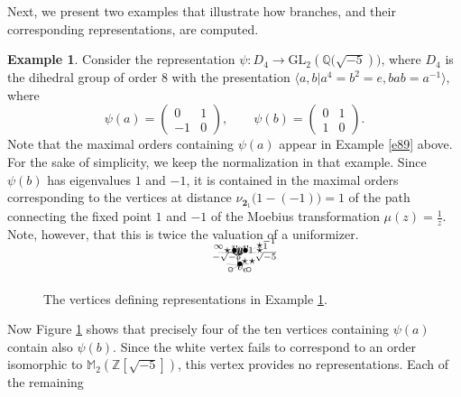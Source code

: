 \documentclass{article}
\theoremstyle{definition}
\newtheorem{ex}[Prop]{Example}
\theoremstyle{remark}
\newcommand\bmattrix[4]{\left(\begin{array}{cc}#1&#2\\#3&#4\end{array}\right)}
\begin{document}
Next, we present two examples that illustrate how branches,
and their corresponding representations, are computed.

\begin{ex}\label{e92}
Consider the representation 
$\psi:D_4\rightarrow\mathrm{GL}_2(\mathbb{Q}
\big(\sqrt{-5})\big)$, where
$D_4$ is the dihedral group of order $8$ with the presentation
$\langle a,b| a^4=b^2=e, bab=a^{-1}\rangle$, where
$$\psi(a)=\bmattrix 01{-1}0,\qquad\psi(b)=\bmattrix 0110.$$
Note that the maximal orders containing $\psi(a)$ appear 
in Example \ref{e89} above. 
For the sake of simplicity, we keep the
normalization in that example.
Since $\psi(b)$ has eigenvalues $1$ and $-1$, it is
contained in the maximal orders corresponding 
to the vertices at distance
$\nu_{\mathbf{2}_1}\big(1-(-1)\big)=1$ 
of the path connecting the
fixed point $1$ and $-1$ of the Moebius 
transformation $\mu(z)=\frac1z$.
Note, however, that this is twice
the valuation of a uniformizer.
\begin{figure}
\unitlength 1mm %
\linethickness{0.4pt}
\ifx\plotpoint\undefined\newsavebox{\plotpoint}\fi %
\[
\begin{picture}(38,12)(-6,40)
\put(15.2,43.2){$\bullet$}\put(15.2,51.8){$\circ$}
\put(16,44){\line(0,1){8}}
\multiput(16,44)(0.688,-.4){10}{\line(1,0){.3}}
\multiput(16,44)(-0.688,-.4){10}{\line(-1,0){.3}}
\put(7.7,38.7){$\circ$}\put(22.3,38.7){$\circ$}
\multiput(15.4,52.6)(-0.086,.05){40}{\line(-1,0){.3}}
\multiput(16.6,52.6)(0.086,.05){40}{\line(1,0){.3}}
\put(10.8,53.8){$\bullet$}\put(19.6,53.8){$\bullet$}
\multiput(20.6,54.6)(0.9,0.35){12}{\line(1,0){.2}}
\multiput(10.6,54.6)(-0.9,0){12}{\line(1,0){.3}}
\multiput(20.6,54.6)(0.9,0){12}{\line(1,0){.3}}
\put(-3.4,54){${}^\infty\star$}\put(31,54){$\star^1$}
\put(31,58){$\star^{-1}$}
\multiput(15.6,44.6)(-0.8,0.1){12}{\line(1,0){.3}}
\multiput(15.6,44.6)(0.8,0.1){12}{\line(1,0){.3}}
\put(-4.5,45.5){${}^{-\sqrt{-5}}\star$}
\put(25,45.5){$\star^{\sqrt{-5}}$}
\put(15.2,53.8){$v$}\put(10.8,55.8){$v_0$}
\put(19.6,55.8){$v_1$}\put(15.2,40.8){$v_c$}
\end{picture}
\]
\caption{The vertices defining representations in Example
\ref{e92}. }\label{oneballs}
\end{figure}
Now Figure \ref{oneballs} shows that precisely four
of the ten vertices containing $\psi(a)$ contain also
$\psi(b)$. Since the white vertex fails to correspond to an
order isomorphic to $\mathbb{M}_2(\mathbb{Z}[\sqrt{-5}])$,
this vertex provides no representations. Each of the remaining

\end{ex}
\end{document}
